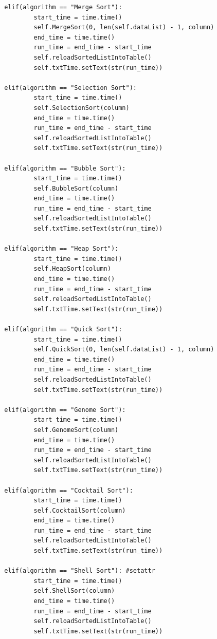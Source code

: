 \documentclass[12pt]{article}
\begin{document}
\begin{verbatim}
        elif(algorithm == "Merge Sort"): 
                start_time = time.time()
                self.MergeSort(0, len(self.dataList) - 1, column)
                end_time = time.time()
                run_time = end_time - start_time
                self.reloadSortedListIntoTable()
                self.txtTime.setText(str(run_time))

        elif(algorithm == "Selection Sort"):
                start_time = time.time()
                self.SelectionSort(column)
                end_time = time.time()
                run_time = end_time - start_time
                self.reloadSortedListIntoTable()
                self.txtTime.setText(str(run_time))

        elif(algorithm == "Bubble Sort"):
                start_time = time.time()
                self.BubbleSort(column)
                end_time = time.time()
                run_time = end_time - start_time
                self.reloadSortedListIntoTable()
                self.txtTime.setText(str(run_time))

        elif(algorithm == "Heap Sort"):
                start_time = time.time()
                self.HeapSort(column)
                end_time = time.time()
                run_time = end_time - start_time
                self.reloadSortedListIntoTable()
                self.txtTime.setText(str(run_time))

        elif(algorithm == "Quick Sort"):
                start_time = time.time()
                self.QuickSort(0, len(self.dataList) - 1, column)
                end_time = time.time()
                run_time = end_time - start_time
                self.reloadSortedListIntoTable()
                self.txtTime.setText(str(run_time))

        elif(algorithm == "Genome Sort"):
                start_time = time.time()
                self.GenomeSort(column)
                end_time = time.time()
                run_time = end_time - start_time
                self.reloadSortedListIntoTable()
                self.txtTime.setText(str(run_time))

        elif(algorithm == "Cocktail Sort"):
                start_time = time.time()
                self.CocktailSort(column)
                end_time = time.time()
                run_time = end_time - start_time
                self.reloadSortedListIntoTable()
                self.txtTime.setText(str(run_time))

        elif(algorithm == "Shell Sort"): #setattr
                start_time = time.time()
                self.ShellSort(column)
                end_time = time.time()
                run_time = end_time - start_time
                self.reloadSortedListIntoTable()
                self.txtTime.setText(str(run_time))


\end{verbatim}
\end{document}
